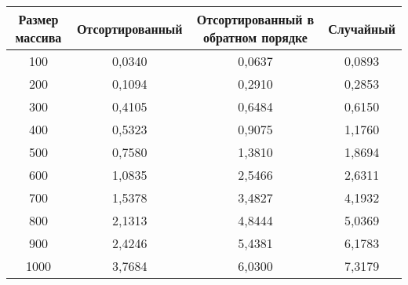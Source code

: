 \begin{center}
	\begin{tabular}{|c|c|c|c|}
		\hline
		Размер массива & Отсортированный & Отсортированный в обратном порядке & Случайный\\
		
		\hline
		100 & 0,0340 & 0,0637 & 0,0893 \\	
		
		\hline
		200 & 0,1094 & 0,2910 & 0,2853 \\	
		
		\hline
		300 & 0,4105 & 0,6484 & 0,6150 \\	
		
		\hline
		400 & 0,5323 & 0,9075 & 1,1760 \\	
		
		\hline
		500 & 0,7580 & 1,3810 & 1,8694 \\	
		
		\hline 
		600 & 1,0835 & 2,5466 & 2,6311 \\	
		
		\hline
		700 & 1,5378 & 3,4827 & 4,1932 \\	
		
		\hline
		800 & 2,1313 & 4,8444 & 5,0369 \\	
		
		\hline
		900 & 2,4246 & 5,4381 & 6,1783 \\	
		
		\hline
		1000 & 3,7684 & 6,0300 & 7,3179 \\	
		
		\hline
		
		
	\end{tabular}
\end{center}	

